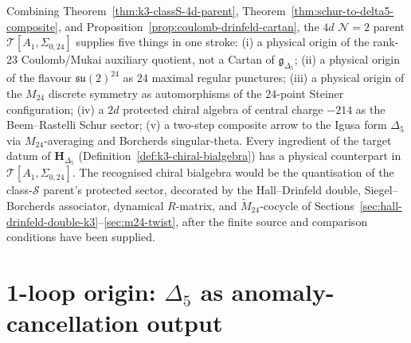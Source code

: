 Combining Theorem~\ref{thm:k3-classS-4d-parent},
Theorem~\ref{thm:schur-to-delta5-composite}, and
Proposition~\ref{prop:coulomb-drinfeld-cartan}, the $4d$ $\mathcal{N}=2$
parent $\mathcal{T}[A_1,\Sigma_{0,24}]$ supplies five things in one stroke:
(i) a physical origin of the rank-$23$ Coulomb/Mukai auxiliary quotient,
not a Cartan of \(\mathfrak g_{\Delta_5}\); (ii) a physical origin of the flavour $\mathfrak{su}(2)^{24}$ as $24$
maximal regular punctures; (iii) a physical origin of the $M_{24}$ discrete
symmetry as automorphisms of the $24$-point Steiner configuration; (iv) a
$2d$ protected chiral algebra of central charge $-214$ as the Beem--Rastelli
Schur sector; (v) a two-step composite arrow to the Igusa form $\Delta_5$
via $M_{24}$-averaging and Borcherds singular-theta. Every ingredient of
the target datum of $\mathbf{H}_{\Delta_5}$
(Definition~\ref{def:k3-chiral-bialgebra}) has a physical counterpart in
$\mathcal{T}[A_1,\Sigma_{0,24}]$. The recognised chiral bialgebra would be
the quantisation of the class-$\mathcal{S}$ parent's protected sector,
decorated by the Hall--Drinfeld double, Siegel--Borcherds associator,
dynamical $R$-matrix, and $\widetilde{M}_{24}$-cocycle of
Sections~\ref{sec:hall-drinfeld-double-k3}--\ref{sec:m24-twist}, after the
finite source and comparison conditions have been supplied.

\section{1-loop origin: \texorpdfstring{$\Delta_5$}{Delta-5} as anomaly-cancellation output}
\label{sec:k3-1loop-output}

